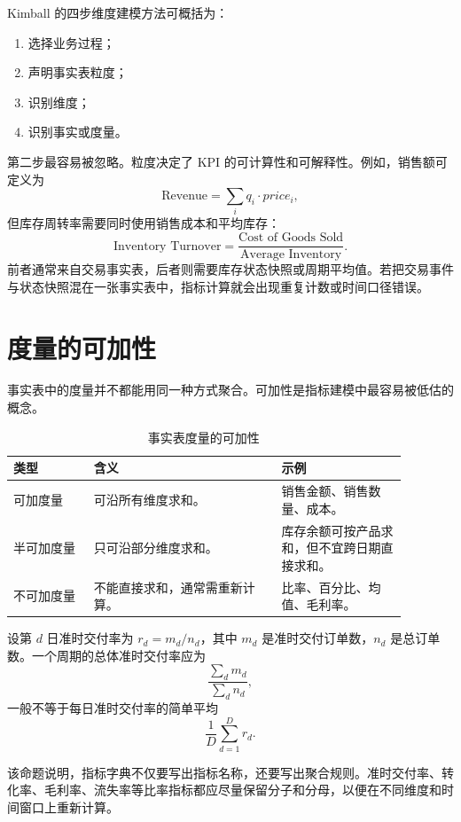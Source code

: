 \documentclass[UTF8,fontset=fandol,openany,zihao=-4]{ctexbook}
\begin{document}
Kimball 的四步维度建模方法可概括为：
\begin{enumerate}
  \item 选择业务过程；
  \item 声明事实表粒度；
  \item 识别维度；
  \item 识别事实或度量。
\end{enumerate}

第二步最容易被忽略。粒度决定了 KPI 的可计算性和可解释性。例如，销售额可定义为
\[
\text{Revenue}=\sum_i q_i\cdot price_i,
\]
但库存周转率需要同时使用销售成本和平均库存：
\[
\text{Inventory Turnover}
=
\frac{\text{Cost of Goods Sold}}{\text{Average Inventory}}.
\]
前者通常来自交易事实表，后者则需要库存状态快照或周期平均值。若把交易事件与状态快照混在一张事实表中，指标计算就会出现重复计数或时间口径错误。

\section{度量的可加性}

事实表中的度量并不都能用同一种方式聚合。可加性是指标建模中最容易被低估的概念。

\begin{table}[htbp]
\centering
\caption{事实表度量的可加性}
\begin{tabular}{p{0.18\linewidth}p{0.42\linewidth}p{0.28\linewidth}}
\toprule
类型 & 含义 & 示例\\
\midrule
可加度量 & 可沿所有维度求和。 & 销售金额、销售数量、成本。\\
半可加度量 & 只可沿部分维度求和。 & 库存余额可按产品求和，但不宜跨日期直接求和。\\
不可加度量 & 不能直接求和，通常需重新计算。 & 比率、百分比、均值、毛利率。\\
\bottomrule
\end{tabular}
\end{table}

\begin{proposition}[比率指标不能直接平均]
设第 \(d\) 日准时交付率为 \(r_d=m_d/n_d\)，其中 \(m_d\) 是准时交付订单数，\(n_d\) 是总订单数。一个周期的总体准时交付率应为
\[
\frac{\sum_d m_d}{\sum_d n_d},
\]
一般不等于每日准时交付率的简单平均
\[
\frac{1}{D}\sum_{d=1}^{D}r_d.
\]
\end{proposition}

该命题说明，指标字典不仅要写出指标名称，还要写出聚合规则。准时交付率、转化率、毛利率、流失率等比率指标都应尽量保留分子和分母，以便在不同维度和时间窗口上重新计算。
\end{document}

